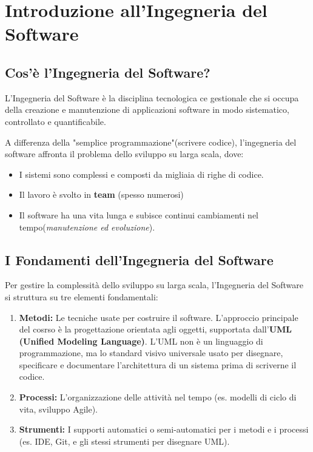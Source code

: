 \documentclass[10pt, a4paper]{article}
\begin{document}
\section{Introduzione all'Ingegneria del Software}
\subsection{Cos'è l'Ingegneria del Software?}
L'Ingegneria del Software è la disciplina tecnologica ce gestionale che si occupa della creazione e manutenzione di applicazioni software in modo sistematico,
controllato e quantificabile.

A differenza della "semplice programmazione"(scrivere codice), l'ingegneria del software affronta il problema dello sviluppo su larga scala, dove:
\begin{itemize}
    \item I sistemi sono complessi e composti da migliaia di righe di codice.
    \item Il lavoro è svolto in \textbf{team} (spesso numerosi)
    \item Il software ha una vita lunga e subisce continui cambiamenti nel tempo(\textit{manutenzione ed evoluzione}).
\end{itemize}

\subsection{I Fondamenti dell'Ingegneria del Software}
Per gestire la complessità dello sviluppo su larga scala, l'Ingegneria del Software si struttura su tre elementi fondamentali:
\begin{enumerate}
    \item \textbf{Metodi:} Le tecniche usate per costruire il software. L'approccio principale del cosrso è la progettazione orientata agli oggetti, supportata dall'\textbf{UML (Unified Modeling Language)}. L'UML non è un linguaggio di programmazione, ma lo standard visivo universale usato per disegnare, specificare e documentare l'architettura di un sistema prima di scriverne il codice.
    \item \textbf{Processi:} L'organizzazione delle attività nel tempo (es. modelli di ciclo di vita, sviluppo Agile).
    \item \textbf{Strumenti:} I supporti automatici o semi-automatici per i metodi e i processi (es. IDE, Git, e gli stessi strumenti per disegnare UML).
\end{enumerate}
\end{document}
